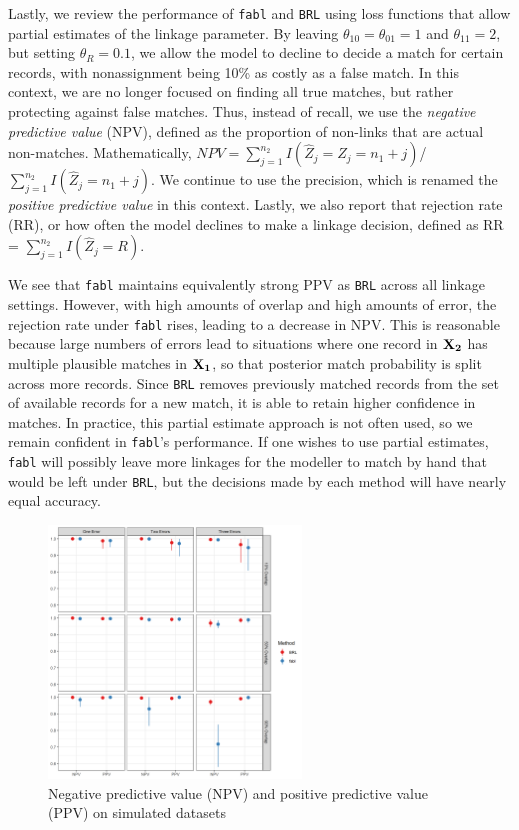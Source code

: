 \documentclass[12pt,letterpaper]{article}
\newcommand{\1}[1]{\mathbb{I}\!\left[#1\right]} %
\begin{document}
Lastly, we review the performance of \texttt{fabl} and \texttt{BRL} using loss functions that allow partial estimates of the linkage parameter. By leaving $\theta_{10} = \theta_{01} = 1$ and $\theta_{11} = 2$, but setting $\theta_R = 0.1$, we allow the model to decline to decide a match for certain records, with nonassignment being 10\% as costly as a false match. In this context, we are no longer focused on finding all true matches, but rather protecting against false matches. Thus, instead of recall, we use the \emph{negative predictive value} (NPV), defined as the proportion of non-links that are actual non-matches. Mathematically, $NPV = \sum_{j=1}^{n_2} I(\hat{Z}_j = Z_j = n_1 + j)$/$\sum_{j=1}^{n_2} I(\hat{Z}_j = n_1 + j)$. We continue to use the precision, which is renamed the \emph{positive predictive value} in this context. Lastly, we also report that rejection rate (RR), or how often the model declines to make a linkage decision, defined as RR = $\sum_{j=1}^{n_2} I(\hat{Z}_j = R)$.

We see that \texttt{fabl} maintains equivalently strong PPV as \texttt{BRL} across all linkage settings. However, with high amounts of overlap and high amounts of error, the rejection rate under \texttt{fabl} rises, leading to a decrease in NPV. This is reasonable because large numbers of errors lead to situations where one record in $\bf{X}_2$ has multiple plausible matches in $\bf{X}_1$, so that posterior match probability is split across more records. Since \texttt{BRL} removes previously matched records from the set of available records for a new match, it is able to retain higher confidence in matches. In practice, this partial estimate approach is not often used, so we remain confident in \texttt{fabl}'s performance. If one wishes to use partial estimates, \texttt{fabl} will possibly leave more linkages for the modeller to match by hand that would be left under \texttt{BRL}, but the decisions made by each method will have nearly equal accuracy. 

\begin{figure}[h!]
\begin{center}
	\includegraphics[width=0.6\textwidth]{../notes/figures/sadinle_sim_plot_partial} 
	\caption{Negative predictive value (NPV) and positive predictive value (PPV) on simulated datasets}
	\label{fig:sadinle_simulation_partial}
\end{center}
\end{figure}
\end{document}

